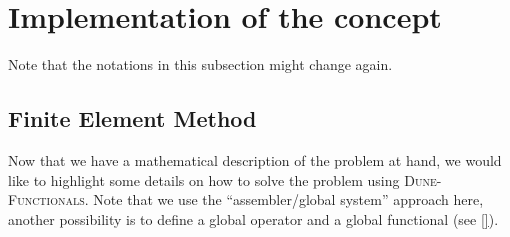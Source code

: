 \documentclass[a4paper,11pt]{article}
\numberwithin{equation}{section}
\newcommand{\dunefunctionals}{\textsc{Dune-Functionals}\xspace}
\begin{document}
\section{Implementation of the concept}
\label{section::implementation}

Note that the notations in this subsection might change again.


\subsection{Finite Element Method}
\label{subsection::discretization::finite_element_method}
	

Now that we have a mathematical description of the problem at hand, we would like to highlight some details on how to
solve the problem using \dunefunctionals. Note that we use the ``assembler/global system'' approach here, another
possibility is to define a global operator and a global functional (see \ref{}).
\end{document}
